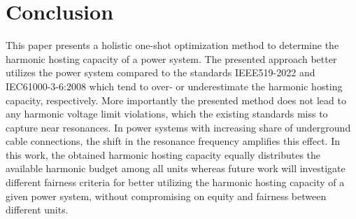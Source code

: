 \section{Conclusion}
\label{sec:conclusion}

This paper presents a holistic one-shot optimization method to determine the harmonic hosting capacity of a power system. The presented approach better utilizes the power system compared to the standards IEEE519-2022 and IEC61000-3-6:2008 which tend to over- or underestimate the harmonic hosting capacity, respectively. More importantly the presented method does not lead to any harmonic voltage limit violations, which the existing standards miss to capture near resonances. In power systems with increasing share of underground cable connections, the shift in the resonance frequency amplifies this effect. In this work, the obtained harmonic hosting capacity equally distributes the available harmonic budget among all units whereas future work will investigate different fairness criteria for better utilizing the harmonic hosting capacity of a given power system, without compromising on equity and fairness between different units.